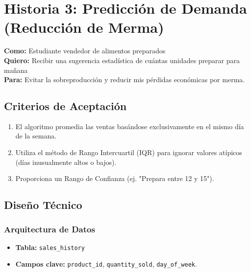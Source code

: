 \documentclass[11pt, letterpaper]{article}
\begin{document}
    \newpage

    \section{Historia 3: Predicción de Demanda (Reducción de Merma)}
   
    \begin{tcolorbox}[colback=green!5!white,colframe=green!50!black,title=HU-03: Recomendación de Preparación]
        \textbf{Como:} Estudiante vendedor de alimentos preparados \\
        \textbf{Quiero:} Recibir una sugerencia estadística de cuántas unidades preparar para mañana \\
        \textbf{Para:} Evitar la sobreproducción y reducir mis pérdidas económicas por merma.
    \end{tcolorbox}
   
    \subsection{Criterios de Aceptación}
    \begin{enumerate}[label=\bfseries\arabic*.]
        \item El algoritmo promedia las ventas basándose exclusivamente en el mismo día de la semana.
        \item Utiliza el método de Rango Intercuartil (IQR) para ignorar valores atípicos (días inusualmente altos o bajos).
        \item Proporciona un Rango de Confianza (ej. "Prepara entre 12 y 15").
    \end{enumerate}
   
    \subsection{Diseño Técnico}
    \subsubsection*{Arquitectura de Datos}
    \begin{itemize}
        \item \textbf{Tabla:} \texttt{sales\_history}
        \item \textbf{Campos clave:} \texttt{product\_id}, \texttt{quantity\_sold}, \texttt{day\_of\_week}.
    \end{itemize}
   
\end{document}
